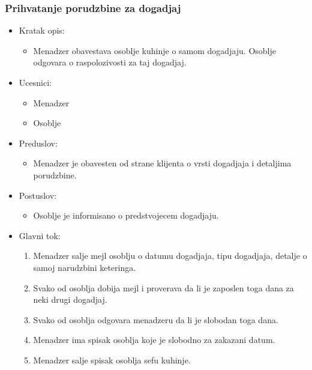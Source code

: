 \documentclass[a4paper]{article}
\begin{document}
\subsubsection{Prihvatanje porudzbine za dogadjaj}
\begin{itemize}
    \item Kratak opis:
    \begin{itemize}
        \item Menadzer obavestava osoblje kuhinje o samom dogadjaju. Osoblje odgovara o raspolozivosti za taj dogadjaj.
    \end{itemize}
\end{itemize}
  \begin{itemize}
        \item Ucesnici:
          \begin{itemize}
        \item Menadzer
    \end{itemize}
      \begin{itemize}
        \item Osoblje
    \end{itemize}
    \end{itemize}
      \begin{itemize}
        \item Preduslov:
          \begin{itemize}
        \item Menadzer je obavesten od strane klijenta o vrsti dogadjaja i detaljima porudzbine.
    \end{itemize}
    
    \end{itemize}
      \begin{itemize}
        \item Postuslov:
          \begin{itemize}
        \item Osoblje je informisano o predstvojecem dogadjaju.
    \end{itemize}
    \end{itemize}
      \begin{itemize}
        \item Glavni tok:
          \begin{enumerate}
              \item Menadzer salje mejl osoblju o datumu dogadjaja, tipu dogadjaja, detalje o samoj narudzbini keteringa.
        
              \item Svako od osoblja dobija mejl i proverava da li je zaposlen toga dana za neki drugi dogadjaj.
         
              \item Svako od osoblja odgovara menadzeru da li je slobodan toga dana.
        
              \item Menadzer ima spisak osoblja koje je slobodno za zakazani datum.
          
              \item Menadzer salje spisak osoblja sefu kuhinje.
          \end{enumerate}
    \end{itemize}
\end{document}
